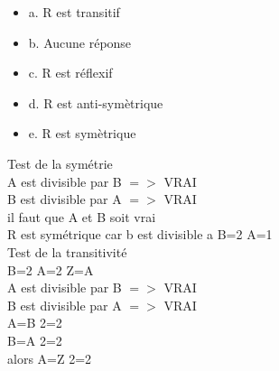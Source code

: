 \begin{itemize}[label=$\square$]
\item {a. R est transitif}
\item {b. Aucune réponse}
\item {c. R est réflexif}
\item {d. R est anti-symètrique}
\item {e. R est symètrique}
\end{itemize}

Test de la symétrie \\

A est divisible par B $=>$ VRAI \\
B est divisible par A $=>$ VRAI \\
il faut que A et B soit vrai \\

R est symétrique car b est divisible a B=2 A=1 \\

Test de la transitivité \\

B=2 A=2 Z=A \\
A est divisible par B $=>$ VRAI \\
B est divisible par A $=>$ VRAI \\

A=B 2=2 \\
B=A 2=2 \\
alors A=Z 2=2 \\
